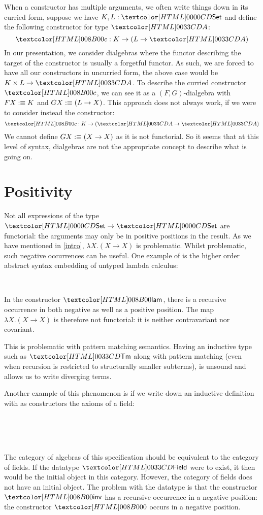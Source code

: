 When a constructor has multiple arguments, we often write things down
in its curried form, \eg suppose we have $K, L : \Set$ and define the
following constructor for type $\Aty$:
$$
\Ac : K \to (L \to \Aty)
$$
In our presentation, we consider dialgebras where the functor
describing the target of the constructor is usually a forgetful
functor. As such, we are forced to have all our constructors in
uncurried form, \eg the above case would be $K \times L \to \Aty$. To
describe the curried constructor $\Ac$, we can see it as a
$(F,G)$-dialgebra with $F X :\equiv K$ and $G X :\equiv (L \to X)$.
This approach does not always work, if we were to consider instead the
constructor:
$$
\Ac : K \to (\Aty \to \Aty)
$$
We cannot define $G X :\equiv (X \to X)$ as it is not functorial. So
it seems that at this level of syntax, dialgebras are not the
appropriate concept to describe what is going on.

\section{Positivity}
\label{positivity}

Not all expressions of the type $\Set \to \Set$ are functorial: the
arguments may only be in positive positions in the result. As we have
mentioned in \cref{intro}, $\lambda X . (X \to X)$ is
problematic. Whilst problematic, such negative occurrences can be
useful. One example of is the higher order abstract syntax embedding
of untyped lambda calculus:
%
\begin{datatype}{\tttmty}{\Set}
  \constr{\ttapp}{\tttmty \to \tttmty \to \tttmty} \\
  \constr{\ttlam}{(\tttmty \to \tttmty) \to \tttmty}
\end{datatype}
%
In the constructor $\ttlam$, there is a recursive occurrence in both
negative as well as a positive position. The map
$\lambda X . (X \to X)$ is therefore not functorial: it is neither
contravariant nor covariant. 

This is problematic with pattern matching semantics. Having an
inductive type such as $\tttmty$ along with pattern matching (even
when recursion is restricted to structurally smaller subterms), is
unsound and allows us to write diverging terms.

Another example of this phenomenon is if we write down an inductive
definition with as constructors the axioms of a field:
%
\begin{datatype}{\fieldty}{\Set}
  \constr{\fieldzero}{\fieldty} \\
  \constrdots \\
   \\
  \constrdots
\end{datatype}
%
The category of algebras of this specification should be equivalent to
the category of fields. If the datatype $\fieldty$ were to exist, it
then would be the initial object in this category. However, the
category of fields does not have an initial object. The problem with
the datatype is that the constructor $\fieldinv$ has a recursive
occurrence in a negative position: the constructor $\fieldzero$ occurs
in a negative position.

